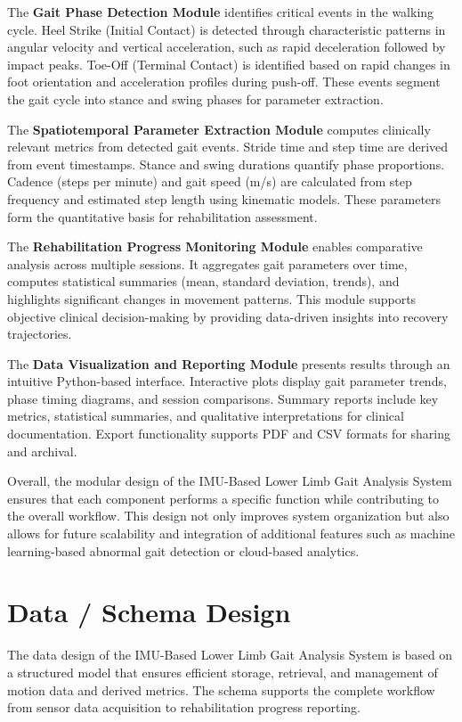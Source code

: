 \documentclass[12pt,a4paper]{report}
\begin{document}
The \textbf{Gait Phase Detection Module} identifies critical events in the walking cycle. Heel Strike (Initial Contact) is detected through characteristic patterns in angular velocity and vertical acceleration, such as rapid deceleration followed by impact peaks. Toe-Off (Terminal Contact) is identified based on rapid changes in foot orientation and acceleration profiles during push-off. These events segment the gait cycle into stance and swing phases for parameter extraction.

The \textbf{Spatiotemporal Parameter Extraction Module} computes clinically relevant metrics from detected gait events. Stride time and step time are derived from event timestamps. Stance and swing durations quantify phase proportions. Cadence (steps per minute) and gait speed (m/s) are calculated from step frequency and estimated step length using kinematic models. These parameters form the quantitative basis for rehabilitation assessment.

The \textbf{Rehabilitation Progress Monitoring Module} enables comparative analysis across multiple sessions. It aggregates gait parameters over time, computes statistical summaries (mean, standard deviation, trends), and highlights significant changes in movement patterns. This module supports objective clinical decision-making by providing data-driven insights into recovery trajectories.

The \textbf{Data Visualization and Reporting Module} presents results through an intuitive Python-based interface. Interactive plots display gait parameter trends, phase timing diagrams, and session comparisons. Summary reports include key metrics, statistical summaries, and qualitative interpretations for clinical documentation. Export functionality supports PDF and CSV formats for sharing and archival.

Overall, the modular design of the IMU-Based Lower Limb Gait Analysis System ensures that each component performs a specific function while contributing to the overall workflow. This design not only improves system organization but also allows for future scalability and integration of additional features such as machine learning-based abnormal gait detection or cloud-based analytics.

\section{Data / Schema Design}

The data design of the IMU-Based Lower Limb Gait Analysis System is based on a structured model that ensures efficient storage, retrieval, and management of motion data and derived metrics. The schema supports the complete workflow from sensor data acquisition to rehabilitation progress reporting.
\end{document}
